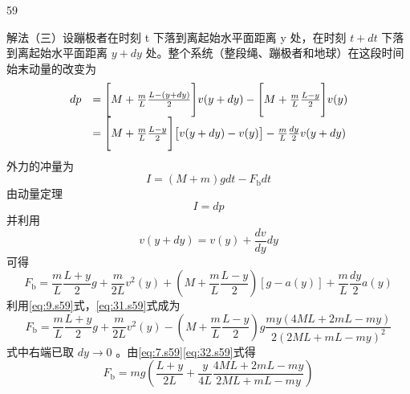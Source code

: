 \begin{solution}{59}
\begin{subsolution}
        解法（三）设蹦极者在时刻 t 下落到离起始水平面距离 y 处，在时刻 $t + dt$ 下落到离起始水平面距离 $y + dy$ 处。整个系统（整段绳、蹦极者和地球）在这段时间始末动量的改变为
        \begin{equation}
            \begin{array}{r l}
                d p & = \Bigg[ M + \frac {m}{L} \frac {L - (y + d y)}{2} \Bigg] v (y + d y) - \Bigg[ M + \frac {m}{L} \frac {L - y}{2} \Bigg] v (y) \\
                & = \Bigg[ M + \frac {m}{L} \frac {L - y}{2} \Bigg] \big[ v (y + d y) - v (y) \big] - \frac {m}{L} \frac {d y}{2} v (y + d y)
            \end{array}
            \label{eq:27.s59}
        \end{equation}
        外力的冲量为
        \begin{equation}
            I = (M + m) g d t - F _ {\mathrm{b}} d t
            \label{eq:28.s59}
        \end{equation}
        由动量定理
        \begin{equation}
            I = d p
            \label{eq:29.s59}
        \end{equation}
        并利用
        \begin{equation}
            v (y + d y) = v (y) + \frac {d v}{d y} d y
            \label{eq:30.s59}
        \end{equation}
        可得
        \begin{equation}
            F _ {\mathrm{b}} = \frac {m}{L} \frac {L + y}{2} g + \frac {m}{2 L} v^{2} (y) + (M + \frac {m}{L} \frac {L - y}{2}) [ g - a (y) ] + \frac {m}{L} \frac {d y}{2} a (y)
            \label{eq:31.s59}
        \end{equation}
        利用\eqref{eq:9.s59}式，\eqref{eq:31.s59}式成为
        \begin{equation}
            F _ {\mathrm{b}} = \frac {m}{L} \frac {L + y}{2} g + \frac {m}{2 L} v^{2} (y) - (M + \frac {m}{L} \frac {L - y}{2}) g \frac {m y (4 M L + 2 m L - m y)}{2 (2 M L + m L - m y)^{2}}
            \label{eq:32.s59}
        \end{equation}
        式中右端已取 $dy \to 0$ 。由\eqref{eq:7.s59}\eqref{eq:32.s59}式得
        \begin{equation}
            F _ {\mathrm{b}} = m g \left(\frac {L + y}{2 L} + \frac {y}{4 L} \frac {4 M L + 2 m L - m y}{2 M L + m L - m y}\right)
            \label{eq:33.s59}
        \end{equation}
    \end{subsolution}
\end{solution}